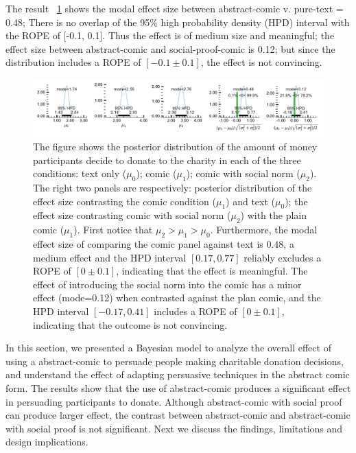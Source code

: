 The result ~\ref{fig:main-experiment2-effect} shows the modal effect size between abstract-comic v. pure-text = 0.48; There is no overlap of the 95\% high probability density (HPD) interval with the ROPE of [-0.1, 0.1]. Thus the effect is of medium size and meaningful; the effect size between abstract-comic and social-proof-comic is 0.12; but since the distribution includes a ROPE of $[-0.1 \pm 0.1]$, the effect is not convincing.


\begin{figure}[htb]
	\includegraphics[width=1\textwidth]{./hari-code/new_exp_text_v_comic_v_social.pdf}
    \caption{The figure shows the posterior distribution of the amount of money participants decide to donate to the charity in each of the three conditions: text only ($\mu_0$); comic ($\mu_1$); comic with social norm ($\mu_2$). The right two panels are respectively: posterior distribution of the effect size contrasting the comic condition ($\mu_1$) and text ($\mu_0$); the effect size contrasting comic with social norm ($\mu_2$) with the plain comic ($\mu_1$). First notice that $\mu_2 > \mu_1 > \mu_0$. Furthermore, the modal effect size of comparing the comic panel against text is 0.48, a medium effect and the HPD interval $[0.17, 0.77]$ reliably excludes a ROPE of $[0 \pm 0.1]$, indicating that the effect is meaningful. The effect of introducing the social norm into the comic has a minor effect (mode=0.12) when contrasted against the plan comic, and the HPD interval $[-0.17, 0.41]$ includes a ROPE of $[0 \pm 0.1]$, indicating that the outcome is not convincing.}
	\label{fig:main-experiment2-effect}
\end{figure}


In this section, we presented a Bayesian model to analyze the overall effect of using a abstract-comic to persuade people making charitable donation decisions, and understand the effect of adapting persuasive techniques in the abstract comic form. The results show that the use of abstract-comic produces a significant effect in persuading participants to donate. Although abstract-comic with social proof can produce larger effect, the contrast between abstract-comic and abstract-comic with social proof is not significant. Next we discuss the findings, limitations and design implications.
